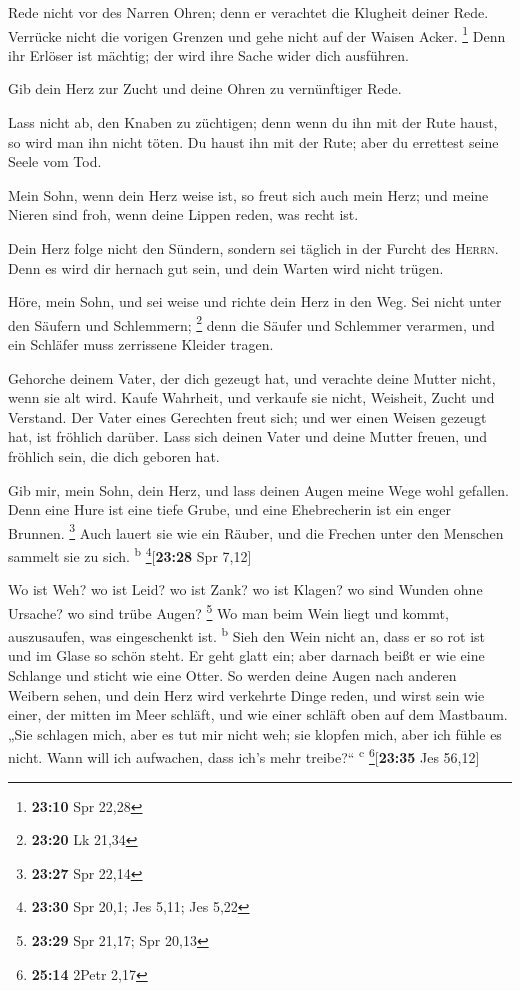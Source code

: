  Rede nicht vor des Narren Ohren; denn er verachtet die
Klugheit deiner Rede.  Verrücke nicht die vorigen Grenzen
und gehe nicht auf der Waisen Acker. \footnote{\textbf{23:10} Spr 22,28}
 Denn ihr Erlöser ist mächtig; der wird ihre Sache wider
dich ausführen.

 Gib dein Herz zur Zucht und deine Ohren zu vernünftiger
Rede.

 Lass nicht ab, den Knaben zu züchtigen; denn wenn du ihn
mit der Rute haust, so wird man ihn nicht töten.  Du
haust ihn mit der Rute; aber du errettest seine Seele vom Tod.

 Mein Sohn, wenn dein Herz weise ist, so freut sich auch
mein Herz;  und meine Nieren sind froh, wenn deine Lippen
reden, was recht ist.

 Dein Herz folge nicht den Sündern, sondern sei täglich
in der Furcht des \textsc{Herrn}.  Denn es wird dir
hernach gut sein, und dein Warten wird nicht trügen.

 Höre, mein Sohn, und sei weise und richte dein Herz in
den Weg.  Sei nicht unter den Säufern und Schlemmern;
\footnote{\textbf{23:20} Lk 21,34}  denn die Säufer und
Schlemmer verarmen, und ein Schläfer muss zerrissene Kleider tragen.

 Gehorche deinem Vater, der dich gezeugt hat, und
verachte deine Mutter nicht, wenn sie alt wird.  Kaufe
Wahrheit, und verkaufe sie nicht, Weisheit, Zucht und Verstand.
 Der Vater eines Gerechten freut sich; und wer einen
Weisen gezeugt hat, ist fröhlich darüber.  Lass sich
deinen Vater und deine Mutter freuen, und fröhlich sein, die dich
geboren hat.

 Gib mir, mein Sohn, dein Herz, und lass deinen Augen
meine Wege wohl gefallen.  Denn eine Hure ist eine tiefe
Grube, und eine Ehebrecherin ist ein enger Brunnen. \footnote{\textbf{23:27}
  Spr 22,14}  Auch lauert sie wie ein Räuber, und die
Frechen unter den Menschen sammelt sie zu sich. \textsuperscript{b}
\footnote{\textbf{23:30} Spr 20,1; Jes 5,11; Jes 5,22}{[}\textbf{23:28}
Spr 7,12{]}

 Wo ist Weh? wo ist Leid? wo ist Zank? wo ist Klagen? wo
sind Wunden ohne Ursache? wo sind trübe Augen? \footnote{\textbf{23:29}
  Spr 21,17; Spr 20,13}  Wo man beim Wein liegt und
kommt, auszusaufen, was eingeschenkt ist. \textsuperscript{b}
 Sieh den Wein nicht an, dass er so rot ist und im Glase
so schön steht. Er geht glatt ein;  aber darnach beißt er
wie eine Schlange und sticht wie eine Otter.  So werden
deine Augen nach anderen Weibern sehen, und dein Herz wird verkehrte
Dinge reden,  und wirst sein wie einer, der mitten im
Meer schläft, und wie einer schläft oben auf dem Mastbaum.
 „Sie schlagen mich, aber es tut mir nicht weh; sie
klopfen mich, aber ich fühle es nicht. Wann will ich aufwachen, dass
ich's mehr treibe?{}`` \textsuperscript{c} \footnote{\textbf{25:14}
  2Petr 2,17}{[}\textbf{23:35} Jes 56,12{]}

